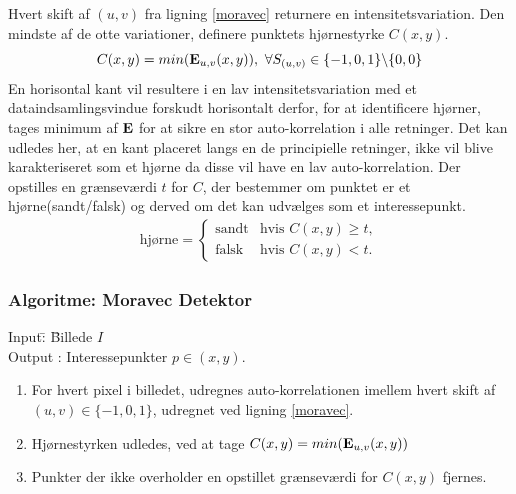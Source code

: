 Hvert skift af $(u,v)$ fra ligning \eqref{moravec} returnere en intensitetsvariation. Den mindste af de otte variationer, definere punktets hjørnestyrke $C(x,y)$.
\begin{equation}
C(x,y)=min(\bold{E}_{u,v}(x,y)),\text{ }\forall S_{(u,v)} \in \lbrace-1,0,1\rbrace \backslash \lbrace0,0\rbrace
\end{equation}
En horisontal kant vil resultere i en lav intensitetsvariation med et dataindsamlingsvindue forskudt horisontalt derfor, for at identificere hjørner, tages minimum af $\bold{E}$ for at sikre en stor auto-korrelation i alle retninger.
Det kan udledes her, at en kant placeret langs en de principielle retninger, ikke vil blive karakteriseret som et hjørne da disse vil have  en lav auto-korrelation. Der opstilles en grænseværdi $t$ for $C$, der bestemmer om punktet er et hjørne(sandt/falsk) og derved om det kan udvælges som et interessepunkt.
\begin{equation}
\begin{split}
\text{hjørne} = 
\begin{cases}
\text{sandt}& \text{hvis } C(x,y)\geq t, \\
\text{falsk }& \text{hvis } C(x,y) < t.
\end{cases}
\end{split}
\label{cornerind}
\end{equation}
\subsubsection*{Algoritme: Moravec Detektor}
\begin{tabbing}
Input\quad \= : \= Billede $I$\\
Output \text{ } \> : \> Interessepunkter $p \in (x,y)$.
\end{tabbing}
\begin{enumerate}
\item{For hvert pixel i billedet, udregnes auto-korrelationen imellem hvert skift af $(u,v) \in \lbrace-1,0,1\rbrace$, udregnet ved ligning \ref{moravec}.}
\item{Hjørnestyrken udledes, ved at tage $C(x,y)=min(\bold{E}_{u,v}(x,y))$}
\item{Punkter der ikke overholder en opstillet grænseværdi for $C(x,y)$ fjernes.}
\end{enumerate}
